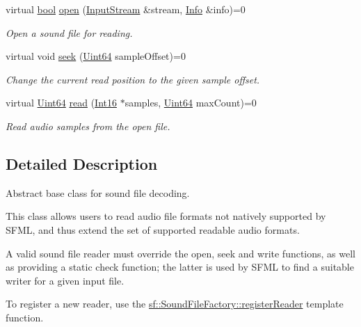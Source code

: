 \begin{DoxyCompactItemize}
virtual \hyperlink{term__entry_8h_a002004ba5d663f149f6c38064926abac}{bool} \hyperlink{classsf_1_1_sound_file_reader_aa1d2fee2ba8f359c833ab74590d55935}{open} (\hyperlink{classsf_1_1_input_stream}{Input\-Stream} \&stream, \hyperlink{structsf_1_1_sound_file_reader_1_1_info}{Info} \&info)=0
\begin{DoxyCompactList}\small\item\em Open a sound file for reading. \end{DoxyCompactList}\item 
virtual void \hyperlink{classsf_1_1_sound_file_reader_a1e18ade5ffe882bdfa20a2ebe7e2b015}{seek} (\hyperlink{namespacesf_add9ac83466d96b9f50a009b9f4064266}{Uint64} sample\-Offset)=0
\begin{DoxyCompactList}\small\item\em Change the current read position to the given sample offset. \end{DoxyCompactList}\item 
virtual \hyperlink{namespacesf_add9ac83466d96b9f50a009b9f4064266}{Uint64} \hyperlink{classsf_1_1_sound_file_reader_a3b7d86769ea07e24e7b0f0486bed7591}{read} (\hyperlink{namespacesf_a3c8e10435e2a310a7741755e66b5c94e}{Int16} $\ast$samples, \hyperlink{namespacesf_add9ac83466d96b9f50a009b9f4064266}{Uint64} max\-Count)=0
\begin{DoxyCompactList}\small\item\em Read audio samples from the open file. \end{DoxyCompactList}\end{DoxyCompactItemize}


\subsection{Detailed Description}
Abstract base class for sound file decoding. 

This class allows users to read audio file formats not natively supported by S\-F\-M\-L, and thus extend the set of supported readable audio formats.

A valid sound file reader must override the open, seek and write functions, as well as providing a static check function; the latter is used by S\-F\-M\-L to find a suitable writer for a given input file.

To register a new reader, use the \hyperlink{classsf_1_1_sound_file_factory_acaf1f0bf1b7c7b9988ec76b33e33fe95}{sf\-::\-Sound\-File\-Factory\-::register\-Reader} template function.

